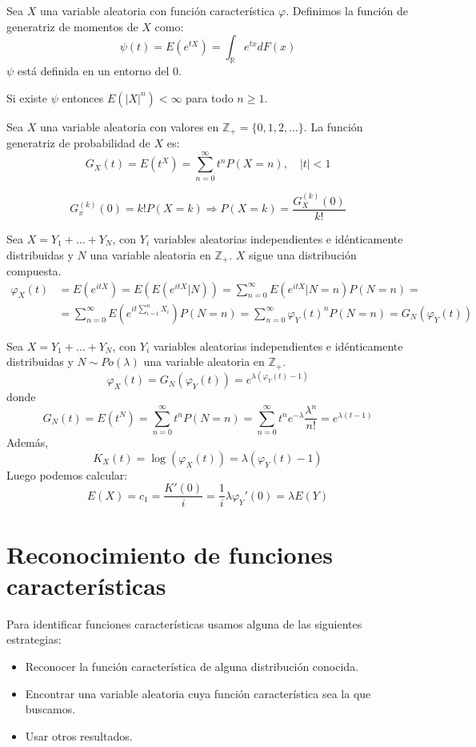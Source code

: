 \begin{definition}
    Sea $X$ una variable aleatoria con función característica $\varphi$.
    Definimos la función de generatriz de momentos de $X$ como:
    $$\psi(t) = E(e^{tX}) = \int_\mathbb{R} e^{tx}dF(x)$$
    $\psi$ está definida en un entorno del 0.
\end{definition}

\begin{remark}
    Si existe $\psi$ entonces $E(|X|^n) < \infty$ para todo $n \geq 1$.
\end{remark}

\begin{definition}
    Sea $X$ una variable aleatoria con valores en $\mathbb{Z}_+ = \{0, 1, 2, \dots\}$.
    La función generatriz de probabilidad de $X$ es:
    $$G_X(t) = E(t^X) = \sum_{n=0}^\infty t^nP(X=n), \quad |t| < 1$$
\end{definition}

\begin{remark}
    $$G_x^{(k)}(0) = k!P(X=k) \Rightarrow P(X=k) = \frac{G_X^{(k)}(0)}{k!}$$
\end{remark}

Sea $X = Y_1 + \dots + Y_N$, con $Y_i$ variables aleatorias independientes e idénticamente distribuidas y $N$ una variable aleatoria en $\mathbb{Z}_+$.
$X$ sigue una distribución compuesta.
\begin{align*}
    \varphi_X(t) & = E(e^{itX}) = E(E(e^{itX}|N)) = \sum_{n=0}^\infty E(e^{itX}|N=n)P(N=n) =                                        \\
                 & = \sum_{n=0}^\infty E(e^{it\sum_{i=1}^n X_i})P(N=n) = \sum_{n=0}^\infty \varphi_Y(t)^nP(N=n) = G_N(\varphi_Y(t))
\end{align*}

\begin{example}
    Sea $X = Y_1 + \dots + Y_N$, con $Y_i$ variables aleatorias independientes e idénticamente distribuidas y $N \sim Po(\lambda)$ una variable aleatoria en $\mathbb{Z}_+$.
    $$\varphi_X(t) = G_N(\varphi_Y(t)) = e^{\lambda(\varphi_Y(t)-1)}$$
    donde
    $$G_N(t) = E(t^N) = \sum_{n=0}^\infty t^nP(N=n) = \sum_{n=0}^\infty t^ne^{-\lambda}\frac{\lambda^n}{n!} = e^{\lambda(t-1)}$$
    Además,
    $$K_X(t) = \log(\varphi_X(t)) = \lambda(\varphi_Y(t) - 1)$$
    Luego podemos calcular:
    $$E(X) = c_1 = \frac{K'(0)}{i} = \frac{1}{i}\lambda \varphi_Y'(0) = \lambda E(Y)$$
\end{example}

\section{Reconocimiento de funciones características}
Para identificar funciones características usamos alguna de las siguientes estrategias:
\begin{itemize}
    \item Reconocer la función característica de alguna distribución conocida.
    \item Encontrar una variable aleatoria cuya función característica sea la que buscamos.
    \item Usar otros resultados.
\end{itemize}

